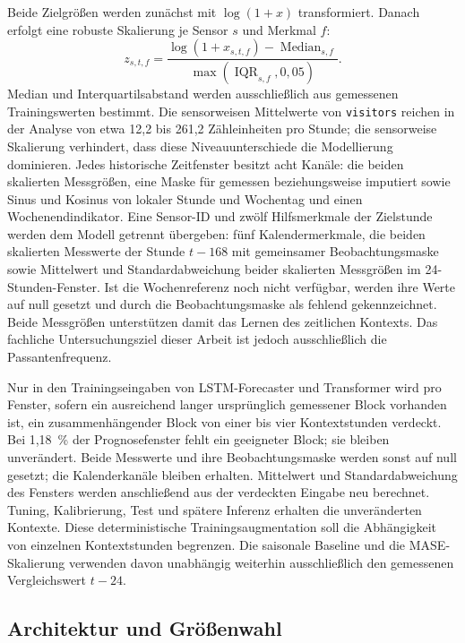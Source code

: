 Beide Zielgrößen werden zunächst mit $\log(1+x)$ transformiert. Danach erfolgt
eine robuste Skalierung je Sensor $s$ und Merkmal $f$:
\begin{equation}
  z_{s,t,f}=\frac{\log(1+x_{s,t,f})-\operatorname{Median}_{s,f}}
  {\max(\operatorname{IQR}_{s,f},0{,}05)}.
\end{equation}
Median und Interquartilsabstand werden ausschließlich aus gemessenen
Trainingswerten bestimmt. Die sensorweisen Mittelwerte von \texttt{visitors}
reichen in der Analyse von etwa 12{,}2 bis 261{,}2 Zähleinheiten pro Stunde; die
sensorweise Skalierung verhindert, dass diese Niveauunterschiede die
Modellierung dominieren. Jedes historische Zeitfenster besitzt acht Kanäle:
die beiden skalierten Messgrößen, eine Maske für gemessen beziehungsweise
imputiert sowie Sinus und Kosinus von lokaler Stunde und Wochentag und einen
Wochenendindikator. Eine Sensor-ID und zwölf Hilfsmerkmale der Zielstunde werden
dem Modell getrennt übergeben: fünf Kalendermerkmale, die beiden skalierten
Messwerte der Stunde $t-168$ mit gemeinsamer Beobachtungsmaske sowie Mittelwert
und Standardabweichung beider skalierten Messgrößen im 24-Stunden-Fenster. Ist
die Wochenreferenz noch nicht verfügbar, werden ihre Werte auf null gesetzt und
durch die Beobachtungsmaske als fehlend gekennzeichnet.
Beide Messgrößen unterstützen damit das Lernen des zeitlichen Kontexts. Das
fachliche Untersuchungsziel dieser Arbeit ist jedoch ausschließlich die
Passantenfrequenz.

Nur in den Trainingseingaben von LSTM-Forecaster und Transformer wird pro
Fenster, sofern ein ausreichend langer ursprünglich gemessener Block vorhanden
ist, ein zusammenhängender Block von einer bis vier Kontextstunden verdeckt.
Bei 1{,}18~\% der Prognosefenster fehlt ein geeigneter Block; sie bleiben
unverändert. Beide Messwerte und ihre Beobachtungsmaske werden sonst auf null
gesetzt; die Kalenderkanäle bleiben erhalten. Mittelwert und Standardabweichung
des Fensters werden anschließend aus der verdeckten Eingabe neu berechnet.
Tuning, Kalibrierung, Test und spätere Inferenz erhalten die unveränderten
Kontexte. Diese deterministische Trainingsaugmentation soll die Abhängigkeit
von einzelnen Kontextstunden begrenzen. Die saisonale Baseline und die
MASE-Skalierung verwenden davon unabhängig weiterhin ausschließlich den
gemessenen Vergleichswert $t-24$.

\subsection{Architektur und Größenwahl}
\label{sec:Methode_Forecasterarchitektur}

